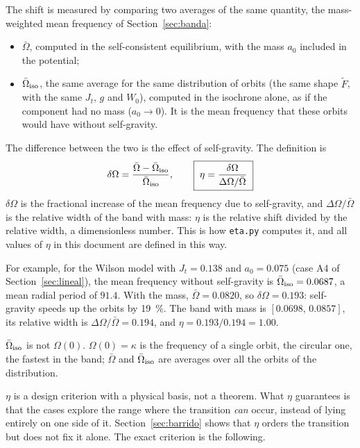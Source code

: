 \documentclass[11pt,a4paper]{article}
\begin{document}
The shift is measured by comparing two averages of the same quantity, the mass-weighted
mean frequency of Section~\ref{sec:banda}:
\begin{itemize}
\item $\bar\Omega$, computed in the self-consistent equilibrium, with the mass $a_0$ included
in the potential;
\item $\bar\Omega_{\rm iso}$, the same average for the same distribution of orbits (the same
shape $\tilde F$, with the same $J_t$, $g$ and $W_0$), computed in the isochrone alone, as if
the component had no mass ($a_0\to0$). It is the mean frequency that these orbits would
have without self-gravity.
\end{itemize}
The difference between the two is the effect of self-gravity. The definition is
\[
  \delta\Omega = \frac{\bar\Omega-\bar\Omega_{\rm iso}}{\bar\Omega_{\rm iso}}, \qquad
  \boxed{\;\eta = \frac{\delta\Omega}{\Delta\Omega/\bar\Omega}\;}
\]
$\delta\Omega$ is the fractional increase of the mean frequency due to self-gravity, and
$\Delta\Omega/\bar\Omega$ is the relative width of the band with mass: $\eta$ is the relative shift
divided by the relative width, a dimensionless number. This is how \texttt{eta.py}
computes it, and all values of $\eta$ in this document are defined in this way.

For example, for the Wilson model with $J_t=0.138$ and $a_0=0.075$ (case A4 of
Section~\ref{sec:lineal}), the mean frequency without self-gravity is
$\bar\Omega_{\rm iso}=0.0687$, a mean radial period of $91.4$. With the mass, $\bar\Omega=0.0820$, so
$\delta\Omega=0.193$: self-gravity speeds up the orbits by \SI{19}{\%}. The band with mass is
$[0.0698,\,0.0857]$, its relative width is $\Delta\Omega/\bar\Omega=0.194$, and $\eta=0.193/0.194=1.00$.

$\bar\Omega_{\rm iso}$ is not $\Omega(0)$. $\Omega(0)=\kappa$ is the frequency of a single orbit, the
circular one, the fastest in the band; $\bar\Omega$ and $\bar\Omega_{\rm iso}$ are averages over all
the orbits of the distribution.

$\eta$ is a design criterion with a physical basis, not a theorem. What $\eta$ guarantees is
that the cases explore the range where the transition \emph{can} occur, instead of lying
entirely on one side of it. Section~\ref{sec:barrido} shows that $\eta$ orders the
transition but does not fix it alone. The exact criterion is the following.
\end{document}
